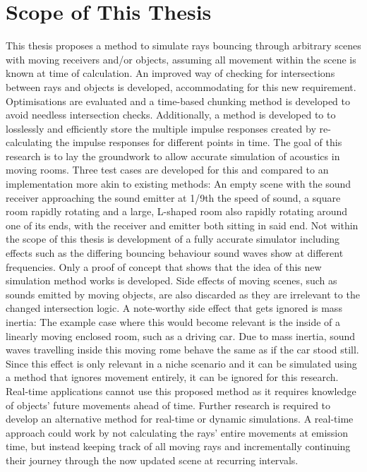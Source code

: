 \section{Scope of This Thesis}

This thesis proposes a method to simulate rays bouncing through arbitrary scenes with moving receivers and/or objects,
assuming all movement within the scene is known at time of calculation.
An improved way of checking for intersections between rays and objects is developed, accommodating for this new requirement.
Optimisations are evaluated and a time-based chunking method is developed to avoid needless intersection checks.
Additionally, a method is developed to to losslessly and efficiently store the multiple impulse responses created by re-calculating
the impulse responses for different points in time.
The goal of this research is to lay the groundwork to allow accurate simulation of acoustics in moving rooms.
Three test cases are developed for this and compared to an implementation more akin to existing methods:
An empty scene with the sound receiver approaching the sound emitter at 1/9th the speed of sound,
a square room rapidly rotating
and a large, L-shaped room also rapidly rotating around one of its ends, with the receiver and emitter both sitting in said end.
\newline
Not within the scope of this thesis is development of a fully accurate simulator
including effects such as the differing bouncing behaviour sound waves show at different frequencies.
Only a proof of concept that shows that the idea of this new simulation method works is developed.
\newline
Side effects of moving scenes, such as sounds emitted by moving objects, are also discarded as they are irrelevant to
the changed intersection logic.
A note-worthy side effect that gets ignored is mass inertia:
The example case where this would become relevant is the inside of a linearly moving enclosed room, such as a driving car.
Due to mass inertia, sound waves travelling inside this moving rome behave the same as if the car stood still.
Since this effect is only relevant in a niche scenario and it can be simulated using a method that ignores movement entirely,
it can be ignored for this research.
\newline
Real-time applications cannot use this proposed method as it requires knowledge of objects' future movements ahead of time.
Further research is required to develop an alternative method for real-time or dynamic simulations.
A real-time approach could work by not calculating the rays' entire movements at emission time,
but instead keeping track of all moving rays and incrementally continuing their journey through the now updated scene
at recurring intervals.
